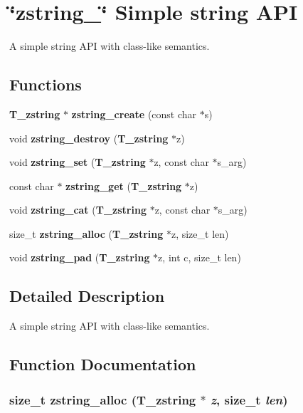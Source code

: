 \section{\char`\"{}zstring\_\-\char`\"{} Simple string API}
\label{group__zstring}
A simple string API with class-like semantics. 
\subsection*{Functions}
\begin{CompactItemize}
\item 
{\bf T\_\-zstring} $\ast$ {\bf zstring\_\-create} (const char $\ast$s)
\item 
void {\bf zstring\_\-destroy} ({\bf T\_\-zstring} $\ast$z)
\item 
void {\bf zstring\_\-set} ({\bf T\_\-zstring} $\ast$z, const char $\ast$s\_\-arg)
\item 
const char $\ast$ {\bf zstring\_\-get} ({\bf T\_\-zstring} $\ast$z)
\item 
void {\bf zstring\_\-cat} ({\bf T\_\-zstring} $\ast$z, const char $\ast$s\_\-arg)
\item 
size\_\-t {\bf zstring\_\-alloc} ({\bf T\_\-zstring} $\ast$z, size\_\-t len)
\item 
void {\bf zstring\_\-pad} ({\bf T\_\-zstring} $\ast$z, int c, size\_\-t len)
\end{CompactItemize}


\subsection{Detailed Description}
A simple string API with class-like semantics.



\subsection{Function Documentation}
\subsubsection{\setlength{\rightskip}{0pt plus 5cm}size\_\-t zstring\_\-alloc ({\bf T\_\-zstring} $\ast$ {\em z}, size\_\-t {\em len})}\label{group__zstring_a5}


